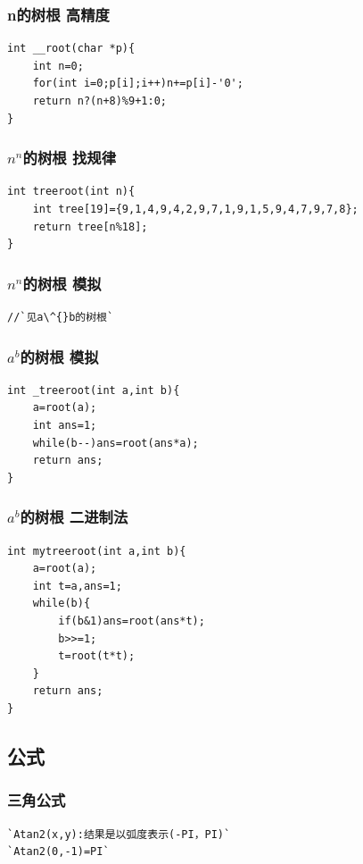 \documentclass[a4paper]{article}
\begin{document}
\begin{CJK*}{UTF8}{gbsn}
\begin{multicols}{3}
\begin{flushleft}
\subsubsection{n的树根 高精度}
\begin{lstlisting}
int __root(char *p){
	int n=0;
	for(int i=0;p[i];i++)n+=p[i]-'0';
	return n?(n+8)%9+1:0;
} 
\end{lstlisting}

\subsubsection{$n^n$的树根 找规律}
\begin{lstlisting}
int treeroot(int n){
	int tree[19]={9,1,4,9,4,2,9,7,1,9,1,5,9,4,7,9,7,8};
	return tree[n%18];
} 
\end{lstlisting}

\subsubsection{$n^n$的树根 模拟}
\begin{lstlisting}
//`见a\^{}b的树根`
\end{lstlisting}

\subsubsection{$a^b$的树根 模拟}
\begin{lstlisting}
int _treeroot(int a,int b){
	a=root(a);
	int ans=1;
	while(b--)ans=root(ans*a);
	return ans;
}
\end{lstlisting}

\subsubsection{$a^b$的树根 二进制法}
\begin{lstlisting}
int mytreeroot(int a,int b){
	a=root(a);
	int t=a,ans=1;
	while(b){
		if(b&1)ans=root(ans*t);
		b>>=1;
		t=root(t*t);
	}
	return ans;
}
\end{lstlisting}

\subsection{公式}

\subsubsection{三角公式}
\begin{lstlisting}
`Atan2(x,y):结果是以弧度表示(-PI，PI)`
`Atan2(0,-1)=PI`
\end{lstlisting}


\end{flushleft}
\end{multicols}
\end{CJK*}
\end{document}
